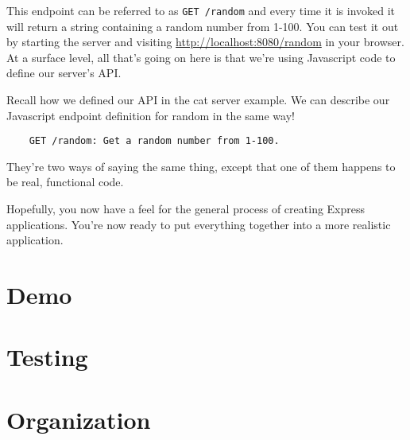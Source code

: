 This endpoint can be referred to as \texttt{GET /random} and every time it is invoked it will return a string containing a random number from 1-100. You can test it out by starting the server and visiting \url{http://localhost:8080/random} in your browser. At a surface level, all that's going on here is that we're using Javascript code to define our server's API. 

\begin{kaobox}[title=Describing the API with English]
    Recall how we defined our API in the cat server example. We can describe our Javascript endpoint definition for random in the same way! 

    \begin{verbatim}
    GET /random: Get a random number from 1-100.
    \end{verbatim}
    
    They're two ways of saying the same thing, except that one of them happens to be real, functional code.
\end{kaobox}

Hopefully, you now have a feel for the general process of creating Express applications. You're now ready to put everything together into a more realistic application.

\section{Demo}

\section{Testing}

\section{Organization}